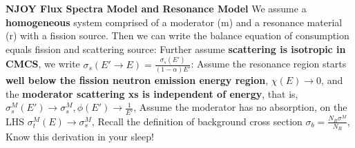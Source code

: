 \documentclass{school-22.211-notes}
\begin{document}
\clearpage
\textbf{NJOY Flux Spectra Model and Resonance Model}
We assume a \textbf{homogeneous} system comprised of a moderator (m) and a resonance material (r) with a fission source. Then we can write the balance equation of consumption equals fission and scattering source: 
Further assume \textbf{scattering is isotropic in CMCS}, we write $\sigma_s(E' \to E) = \frac{\sigma_s(E')}{(1 - \alpha)E'}$: 
Assume the resonance region starts \textbf{well below the fission neutron emission energy region}, $\chi(E) \to 0$, and the \textbf{moderator scattering xs is independent of energy}, that is,$\sigma_s^M(E') \to \sigma_s^M, \phi(E') \to \frac{1}{E'}$,
Assume the moderator has no absorption, on the LHS $\sigma_t^M(E) \to \sigma_s^M$, 
Recall the definition of background cross section $\displaystyle \sigma_b = \frac{N_R \sigma^M}{N_R}$, 
Know this derivation in your sleep! 
\end{document}
